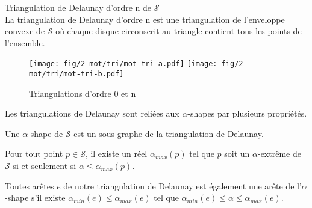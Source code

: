 \begin{Definition}{Triangulation de Delaunay d'ordre n de $\mathcal{S}$}\\
\label{def:tri-del-n}
  La triangulation de Delaunay d'ordre n est une triangulation de l'enveloppe convexe de $\mathcal{S}$ où chaque disque circonscrit au triangle contient tous les points de l'ensemble.
\end{Definition}

\begin{figure}[H]
  \centering
  \texttt{[image: fig/2-mot/tri/mot-tri-a.pdf]}
  \texttt{[image: fig/2-mot/tri/mot-tri-b.pdf]}
  \caption{Triangulations d'ordre 0 et n}
\end{figure}


Les triangulations de Delaunay sont reliées aux $\alpha$-shapes par plusieurs propriétés. \cite{EdeKirSei83}

\begin{Lemma}
  Une $\alpha$-shape de $\mathcal{S}$ est un sous-graphe de la triangulation de Delaunay.
\end{Lemma}

\begin{Lemma}
  Pour tout point $p \in \mathcal{S}$, il existe un réel $\alpha_{max}(p)$ tel que $p$ soit un $\alpha$-extrême de $\mathcal{S}$ si et seulement si $\alpha \leq \alpha_{max}(p)$.
\end{Lemma}

\begin{Lemma}
  Toutes arêtes $e$ de notre triangulation de Delaunay est également une arête de l'$\alpha$-shape s'il existe $\alpha_{min}(e) \leq \alpha_{max}(e)$ tel que $\alpha_{min}(e) \leq \alpha \leq \alpha_{max}(e)$.
\end{Lemma}

